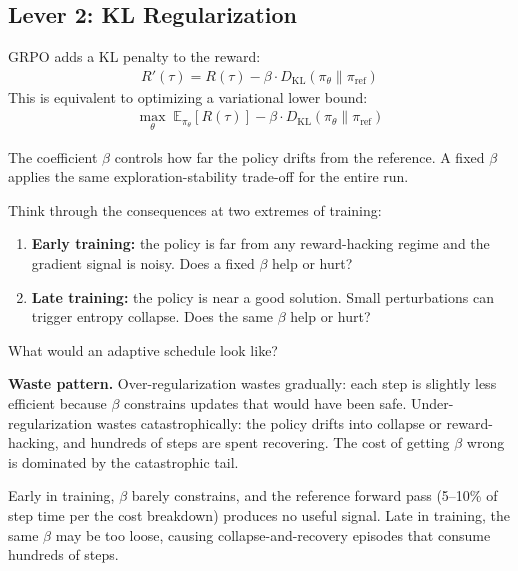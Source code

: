 \subsection*{Lever 2: KL Regularization}

\begin{thinkfirst}
GRPO adds a KL penalty to the reward:
\begin{align*}
  R'(\tau) = R(\tau) - \beta \cdot D_{\mathrm{KL}}(\pi_\theta \| \pi_{\mathrm{ref}})
\end{align*}
This is equivalent to optimizing a variational lower bound:
\begin{align*}
  \max_\theta \; \mathbb{E}_{\pi_\theta}[R(\tau)] - \beta \cdot D_{\mathrm{KL}}(\pi_\theta \| \pi_{\mathrm{ref}})
\end{align*}

The coefficient $\beta$ controls how far the policy drifts from the reference. A fixed $\beta$ applies the same exploration-stability trade-off for the entire run.

Think through the consequences at two extremes of training:
\begin{enumerate}
  \item \textbf{Early training:} the policy is far from any reward-hacking regime and the gradient signal is noisy. Does a fixed $\beta$ help or hurt?
  \item \textbf{Late training:} the policy is near a good solution. Small perturbations can trigger entropy collapse. Does the same $\beta$ help or hurt?
\end{enumerate}
What would an adaptive schedule look like?
\end{thinkfirst}

\textbf{Waste pattern.} Over-regularization wastes gradually: each step is slightly less efficient because $\beta$ constrains updates that would have been safe. Under-regularization wastes catastrophically: the policy drifts into collapse or reward-hacking, and hundreds of steps are spent recovering. The cost of getting $\beta$ wrong is dominated by the catastrophic tail.

Early in training, $\beta$ barely constrains, and the reference forward pass (5--10\% of step time per the cost breakdown) produces no useful signal. Late in training, the same $\beta$ may be too loose, causing collapse-and-recovery episodes that consume hundreds of steps.

